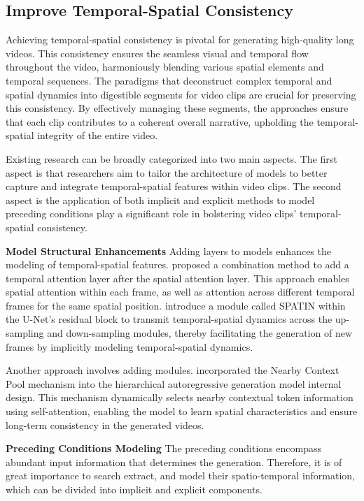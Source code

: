 \documentclass{article}
\begin{document}
\subsection{Improve Temporal-Spatial Consistency}
Achieving temporal-spatial consistency is pivotal for generating high-quality long videos. This consistency ensures the seamless visual and temporal flow throughout the video, harmoniously blending various spatial elements and temporal sequences. The paradigms that deconstruct complex temporal and spatial dynamics into digestible segments for video clips are crucial for preserving this consistency. By effectively managing these segments, the approaches ensure that each clip contributes to a coherent overall narrative, upholding the temporal-spatial integrity of the entire video.


Existing research can be broadly categorized into two main aspects. The first aspect is that researchers aim to tailor the architecture of models to better capture and integrate temporal-spatial features within video clips. The second aspect is the application of both implicit and explicit methods to model preceding conditions play a significant role in bolstering video clips' temporal-spatial consistency. 


\noindent\textbf{Model Structural Enhancements} 
Adding layers to models enhances the modeling of temporal-spatial features. \cite{FVD} proposed a combination method to add a temporal attention layer after the spatial attention layer. This approach enables spatial attention within each frame, as well as attention across different temporal frames for the same spatial position. \cite{MCVD} introduce a module called SPATIN within the U-Net's residual block to transmit temporal-spatial dynamics across the up-sampling and down-sampling modules, thereby facilitating the generation of new frames by implicitly modeling temporal-spatial dynamics. 


Another approach involves adding modules. \cite{NUWA-infinity} incorporated the Nearby Context Pool mechanism into the hierarchical autoregressive generation model internal design. This mechanism dynamically selects nearby contextual token information using self-attention, enabling the model to learn spatial characteristics and ensure long-term consistency in the generated videos. 


\noindent\textbf{Preceding Conditions Modeling} 
The preceding conditions encompass abundant input information that determines the generation. Therefore, it is of great importance to search extract, and model their spatio-temporal information, which can be divided into implicit and explicit components.
\end{document}
